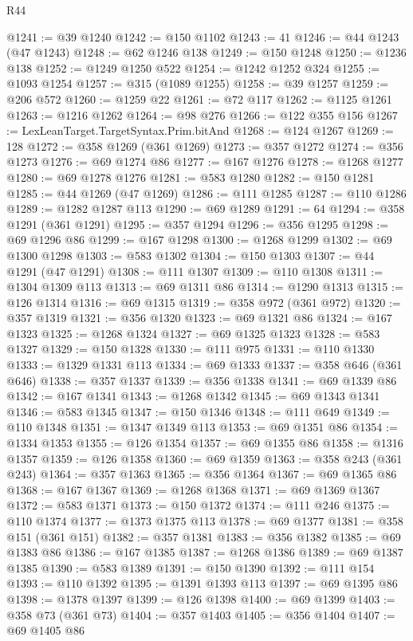 \begin{lexlean}{R44}
\begin{coremodule}
@1241 := @39 @1240
@1242 := @150 @1102
@1243 := 41
@1246 := @44 @1243 (@47 @1243)
@1248 := @62 @1246 @138
@1249 := @150 @1248
@1250 := @1236 @138
@1252 := @1249 @1250 @522
@1254 := @1242 @1252 @324
@1255 := @1093 @1254
@1257 := @315 (@1089 @1255)
@1258 := @39 @1257
@1259 := @206 @572
@1260 := @1259 @22
@1261 := @72 @117
@1262 := @1125 @1261
@1263 := @1216 @1262
@1264 := @98 @276
@1266 := @122 @355 @156
@1267 := LexLeanTarget.TargetSyntax.Prim.bitAnd
@1268 := @124 @1267
@1269 := 128
@1272 := @358 @1269 (@361 @1269)
@1273 := @357 @1272
@1274 := @356 @1273
@1276 := @69 @1274 @86
@1277 := @167 @1276
@1278 := @1268 @1277
@1280 := @69 @1278 @1276
@1281 := @583 @1280
@1282 := @150 @1281
@1285 := @44 @1269 (@47 @1269)
@1286 := @111 @1285
@1287 := @110 @1286
@1289 := @1282 @1287 @113
@1290 := @69 @1289
@1291 := 64
@1294 := @358 @1291 (@361 @1291)
@1295 := @357 @1294
@1296 := @356 @1295
@1298 := @69 @1296 @86
@1299 := @167 @1298
@1300 := @1268 @1299
@1302 := @69 @1300 @1298
@1303 := @583 @1302
@1304 := @150 @1303
@1307 := @44 @1291 (@47 @1291)
@1308 := @111 @1307
@1309 := @110 @1308
@1311 := @1304 @1309 @113
@1313 := @69 @1311 @86
@1314 := @1290 @1313
@1315 := @126 @1314
@1316 := @69 @1315
@1319 := @358 @972 (@361 @972)
@1320 := @357 @1319
@1321 := @356 @1320
@1323 := @69 @1321 @86
@1324 := @167 @1323
@1325 := @1268 @1324
@1327 := @69 @1325 @1323
@1328 := @583 @1327
@1329 := @150 @1328
@1330 := @111 @975
@1331 := @110 @1330
@1333 := @1329 @1331 @113
@1334 := @69 @1333
@1337 := @358 @646 (@361 @646)
@1338 := @357 @1337
@1339 := @356 @1338
@1341 := @69 @1339 @86
@1342 := @167 @1341
@1343 := @1268 @1342
@1345 := @69 @1343 @1341
@1346 := @583 @1345
@1347 := @150 @1346
@1348 := @111 @649
@1349 := @110 @1348
@1351 := @1347 @1349 @113
@1353 := @69 @1351 @86
@1354 := @1334 @1353
@1355 := @126 @1354
@1357 := @69 @1355 @86
@1358 := @1316 @1357
@1359 := @126 @1358
@1360 := @69 @1359
@1363 := @358 @243 (@361 @243)
@1364 := @357 @1363
@1365 := @356 @1364
@1367 := @69 @1365 @86
@1368 := @167 @1367
@1369 := @1268 @1368
@1371 := @69 @1369 @1367
@1372 := @583 @1371
@1373 := @150 @1372
@1374 := @111 @246
@1375 := @110 @1374
@1377 := @1373 @1375 @113
@1378 := @69 @1377
@1381 := @358 @151 (@361 @151)
@1382 := @357 @1381
@1383 := @356 @1382
@1385 := @69 @1383 @86
@1386 := @167 @1385
@1387 := @1268 @1386
@1389 := @69 @1387 @1385
@1390 := @583 @1389
@1391 := @150 @1390
@1392 := @111 @154
@1393 := @110 @1392
@1395 := @1391 @1393 @113
@1397 := @69 @1395 @86
@1398 := @1378 @1397
@1399 := @126 @1398
@1400 := @69 @1399
@1403 := @358 @73 (@361 @73)
@1404 := @357 @1403
@1405 := @356 @1404
@1407 := @69 @1405 @86

\end{coremodule}
\end{lexlean}
